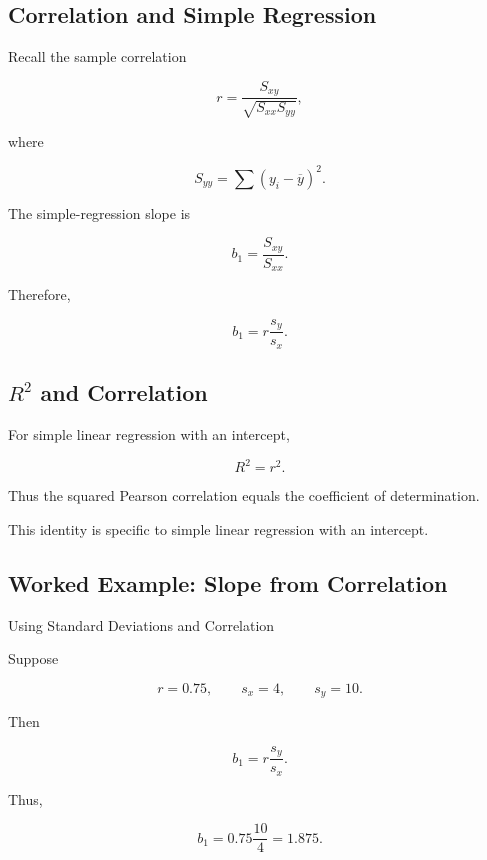 \subsection{Correlation and Simple Regression}
\label{subsec:correlation-simple-regression}

Recall the sample correlation

\[
r
=
\frac{
S_{xy}
}{
\sqrt{
S_{xx}S_{yy}
}
},
\]

where

\[
S_{yy}
=
\sum
(y_i-\overline{y})^2.
\]

The simple-regression slope is

\[
b_1
=
\frac{S_{xy}}{S_{xx}}.
\]

Therefore,

\[
\boxed{
b_1
=
r
\frac{s_y}{s_x}.
}
\]

\subsection{\(R^2\) and Correlation}
\label{subsec:r2-correlation}

For simple linear regression with an intercept,

\[
\boxed{
R^2=r^2.
}
\]

Thus the squared Pearson correlation equals the coefficient of
determination.

This identity is specific to simple linear regression with an intercept.

\subsection{Worked Example: Slope from Correlation}
\label{subsec:worked-slope-correlation}

\begin{workedexamplebox}{Using Standard Deviations and Correlation}

Suppose

\[
r=0.75,
\qquad
s_x=4,
\qquad
s_y=10.
\]

Then

\[
b_1
=
r
\frac{s_y}{s_x}.
\]

Thus,

\begin{answerbox}
\[
\boxed{
b_1
=
0.75
\frac{10}{4}
=
1.875.
}
\]
\end{answerbox}

\end{workedexamplebox}


